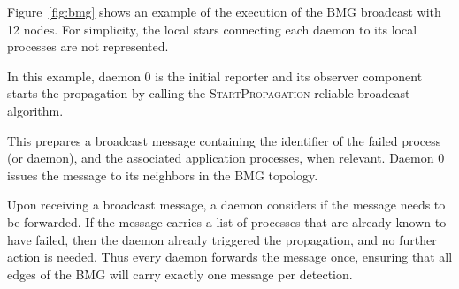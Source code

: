\documentclass[sigconf]{acmart}
\begin{document}
Figure~\ref{fig:bmg} shows an example of the execution of the BMG broadcast
with 12 nodes. For simplicity, the local stars connecting each daemon to 
its local processes are not represented.

\begin{compactenum}
 \item In this example, daemon 0 is the initial reporter and its observer component starts the propagation by calling the \textsc{StartPropagation} reliable broadcast algorithm.
 \item This prepares a broadcast message containing the identifier of the
 failed process (or daemon), and the associated application processes, when relevant.
 Daemon 0 issues the message to its neighbors in the BMG topology.
 \item Upon receiving a broadcast message, a daemon considers if the message needs
 to be forwarded. If the message carries a list of processes that are already known to
 have failed, then the daemon already triggered the propagation, and no further
 action is needed. Thus every daemon forwards the message once, ensuring that
 all edges of the BMG will carry exactly one message per detection.
\end{compactenum}
\end{document}
